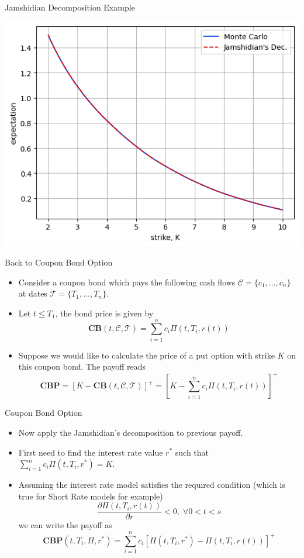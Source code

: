 \documentclass{beamer}
\begin{document}
\begin{frame}{Jamshidian Decomposition Example}
\begin{center}
    \includegraphics[width=0.65\linewidth]{images/jamshidian_ex1}
\end{center}
\end{frame}

\begin{frame}{Back to Coupon Bond Option}
\begin{itemize}
	\item<1-> Consider a coupon bond which pays the following cash flows $\mathcal{C}=\{c_1,\dots,c_n\}$ at dates $\mathcal{T}=\{T_1,\ldots,T_n\}$.
	\item<2-> Let $t\leq T_1$, the bond price is given by
	\begin{equation*}
		\textbf{CB}(t,\mathcal{C},\mathcal{T})=\sum_{i=1}^n c_i \Pi(t, T_i, r(t))
	\end{equation*}
	\item<3-> Suppose we would like to calculate the price of a put option with strike $K$ on this coupon bond. The payoff reads
	\begin{equation*}
		\textbf{CBP}=\left[K-\textbf{CB}(t,\mathcal{C},\mathcal{T})\right]^+ = \left[K-\sum_{i=1}^n c_i \Pi(t, T_i, r(t))\right]^+
	\end{equation*}
\end{itemize}
\end{frame}

\begin{frame}{Coupon Bond Option}
\begin{itemize}
	\item<1-> Now apply the Jamshidian's decomposition to previous payoff.
	\item<2-> First need to find the interest rate value $r^*$ such that $\sum_{i=1}^n c_i \Pi(t, T_i, r^*) = K$.
	\item<3-> Assuming the interest rate model satisfies the required condition (which is true for Short Rate models for example)
	\begin{equation*}
		\frac{\partial \Pi(t,T_i,r(t))}{\partial r}<0,\;\forall 0<t<s
	\end{equation*}
	we can write the payoff as
	\begin{equation}
		\textbf{CBP}(t,T_i,\Pi,r^*) = \sum_{i=1}^n c_i [\Pi(t, T_i, r^*)-\Pi(t, T_i, r(t))]^+
	\label{eq:bond_option_payoff}
	\end{equation}
\end{itemize}
\end{frame}
\end{document}
